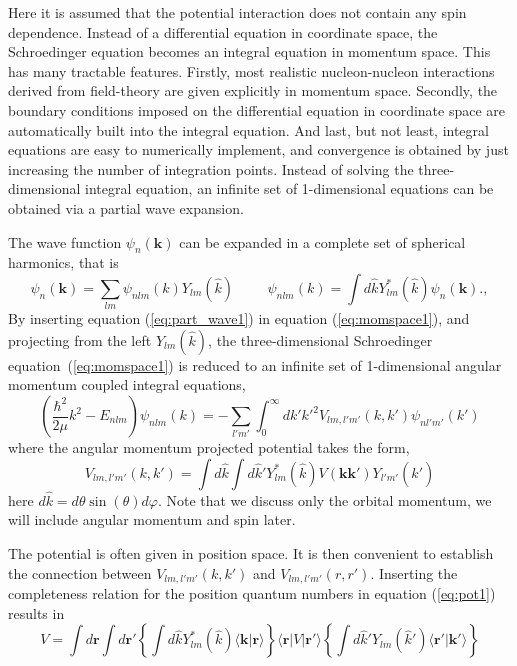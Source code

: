 \documentclass[graybox,sectrefs,envcountresetchap,open=right]{svmonodo}
\begin{document}
Here it is assumed that the potential interaction does not contain any spin dependence. 
Instead of a differential equation in coordinate space, the Schroedinger
equation becomes an integral equation in momentum space. This has 
many tractable features. Firstly, most realistic 
nucleon-nucleon interactions derived from field-theory are given 
explicitly in momentum space. Secondly, the boundary conditions imposed
on the differential equation in coordinate space are automatically built into the
integral equation. And last, but not least, integral equations are easy to numerically 
implement, and convergence is obtained by just increasing the number of integration
points.
Instead of solving the three-dimensional integral equation, an 
infinite set of 1-dimensional equations can be obtained via a  partial wave
expansion. 


The wave function $\psi_n(\mathbf{k})$ can be expanded in a complete set of spherical harmonics, that is
\begin{equation}
  \psi_n(\mathbf{k}) = \sum _{lm} \psi_{nlm}(k)Y_{lm}(\hat{k}) \hspace{1cm} \psi_{nlm}(k) = \int d\hat{k} Y_{lm}^*(\hat{k})\psi_n(\mathbf{k}).   , 
  \label{eq:part_wave1}
\end{equation}
By inserting equation (\ref{eq:part_wave1}) in equation (\ref{eq:momspace1}), and projecting from the left
$Y_{lm}(\hat{k})$, the three-dimensional Schroedinger equation~(\ref{eq:momspace1}) is reduced
to an infinite set of  1-dimensional angular momentum coupled integral equations, 
\begin{equation}
  \left( \frac{\hbar^2}{2\mu} k^2-E_{nlm}\right)\psi_{nlm}(k) = -\sum_{l'm'}\int_{0}^\infty dk' {k'}^2 V_{lm, l'm'}(k,k') \psi_{nl'm'}(k') 
  \label{eq:part_wave2}
\end{equation}
where the angular momentum projected potential takes the form,
\begin{equation}
  V_{lm, l'm'}(k,k') = \int d{\hat{k}} \int d{\hat{k}'}Y_{lm}^*(\hat{k})V(\mathbf{k}\mathbf{k'})Y_{l'm'}(\hat{k}')
  \label{eq:pot1}
\end{equation}
here $d\hat{k} = d\theta\sin(\theta)d\varphi$.
Note that we discuss only the orbital momentum, we will include angular momentum and spin later. 



The potential is often given in position space. It is then convenient to establish 
the connection between $V_{lm, l'm'}(k,k')$ and $V_{lm, l'm'}(r,r')$. Inserting 
the completeness relation for the position quantum numbers in equation (\ref{eq:pot1}) results in
\begin{equation}
V =\int d\mathbf{r}\int d\mathbf{r}'\left\{\int d{\hat{k}}Y_{lm}^*(\hat{k})\langle \mathbf{k}\vert \mathbf{r}\rangle\right\}\langle\mathbf{r}\vert V\vert\mathbf{r}'\rangle\left\{\int d\hat{k}'Y_{lm}(\hat{k}')\langle\mathbf{r'}\vert\mathbf{k}'\rangle\right\}
\label{eq:pot2}
\end{equation}
\end{document}
